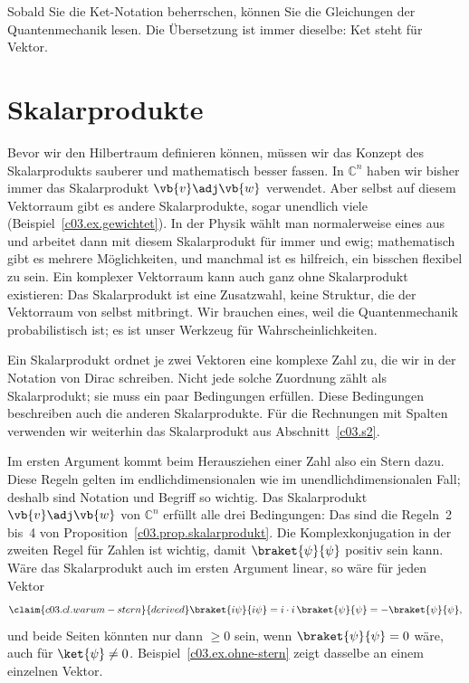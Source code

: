 Sobald Sie die Ket-Notation beherrschen, können Sie die Gleichungen der Quantenmechanik lesen.
Die Übersetzung ist immer dieselbe: Ket steht für Vektor.

\section{Skalarprodukte}\label{c03.s5}

Bevor wir den Hilbertraum definieren können, müssen wir das Konzept des Skalarprodukts
sauberer und mathematisch besser fassen. In $\mathbb{C}^n$ haben wir bisher immer das
Skalarprodukt $\vb{v}\adj\vb{w}$ verwendet. Aber selbst auf diesem Vektorraum gibt es andere
Skalarprodukte, sogar unendlich viele (Beispiel~\ref{c03.ex.gewichtet}). In der Physik wählt man normalerweise eines
aus und arbeitet dann mit diesem Skalarprodukt für immer und ewig; mathematisch gibt es
mehrere Möglichkeiten, und manchmal ist es hilfreich, ein bisschen flexibel zu sein. Ein
komplexer Vektorraum kann auch ganz ohne Skalarprodukt existieren: Das Skalarprodukt ist eine
Zusatzwahl, keine Struktur, die der Vektorraum von selbst mitbringt. Wir brauchen eines, weil
die Quantenmechanik probabilistisch ist; es ist unser Werkzeug für Wahrscheinlichkeiten.

Ein Skalarprodukt ordnet je zwei Vektoren eine komplexe Zahl zu, die wir in der Notation von
Dirac schreiben. Nicht jede solche Zuordnung zählt als Skalarprodukt; sie muss ein paar
Bedingungen erfüllen. Diese Bedingungen beschreiben auch die anderen Skalarprodukte. Für die
Rechnungen mit Spalten verwenden wir weiterhin das Skalarprodukt aus Abschnitt~\ref{c03.s2}.


Im ersten Argument kommt beim Herausziehen einer Zahl also ein Stern dazu. Diese Regeln
gelten im endlichdimensionalen wie im unendlichdimensionalen Fall; deshalb sind Notation und
Begriff so wichtig. Das Skalarprodukt $\vb{v}\adj\vb{w}$ von $\mathbb{C}^n$ erfüllt alle drei
Bedingungen: Das sind die Regeln~2 bis~4 von Proposition~\ref{c03.prop.skalarprodukt}. Die
Komplexkonjugation in der zweiten Regel für Zahlen ist wichtig, damit $\braket{\psi}{\psi}$
positiv sein kann. Wäre das Skalarprodukt auch im ersten Argument linear, so wäre für jeden
Vektor
\begin{equation}\label{c03.eq.warum-stern}\claim{c03.cl.warum-stern}{derived}
  \braket{i\psi}{i\psi} = i \cdot i\, \braket{\psi}{\psi} = -\braket{\psi}{\psi} ,
\end{equation}
und beide Seiten könnten nur dann $\geq 0$ sein, wenn $\braket{\psi}{\psi} = 0$ wäre, auch für
$\ket{\psi} \neq 0$. Beispiel~\ref{c03.ex.ohne-stern} zeigt dasselbe an einem einzelnen
Vektor.


